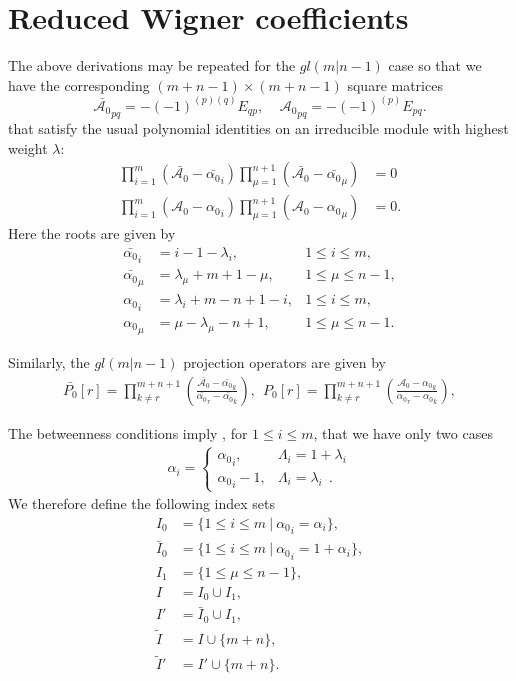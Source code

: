 \documentclass[12pt]{article}
\def\nn{\nonumber}
\begin{document}
\section{Reduced Wigner coefficients} 
\label{Wigner}
The above derivations may be repeated for the $gl(m|n-1)$ case so that we have the corresponding $(m+n-1) \times (m+n-1)$ square matrices
$$
\bar{\mathcal{A}_0}_{pq} = -(-1)^{(p)(q)} E_{qp}, ~~~~~{\mathcal{A}_0}_{pq} = -(-1)^{(p)} E_{pq}.
$$
that satisfy the usual polynomial identities on an irreducible module with highest weight $\lambda$:
\begin{align*}
\prod_{i=1}^m (\bar{\mathcal{A}_0} - \bar{\alpha_0}_i) \prod^{n+1}_{\mu = 1} (\bar{\mathcal{A}_0} - \bar{\alpha_0}_\mu) &= 0 \\
	\prod^m_{i=1} (\mathcal{A}_0 - {\alpha_0}_i ) \prod^{n+1}_{\mu=1} (\mathcal{A}_0 - {\alpha_0}_\mu) &= 0 .
\end{align*}
Here the roots are given by
\begin{align*}
\bar{\alpha_0}_i  &= i - 1 -{\lambda}_i , &1\leq i\leq m, \\
\bar{\alpha_0}_\mu &= {\lambda}_\mu + m + 1 - \mu,  &1\leq \mu \leq n - 1, \\
{\alpha_0}_i &= {\lambda}_i + m - n + 1 - i, &1\leq i\leq m, \\
{\alpha_0}_\mu &= \mu-{\lambda}_\mu - n + 1, &1\leq \mu \leq n - 1.  
\end{align*}

Similarly, the $gl(m|n-1)$ projection operators are given by
\begin{align}
\bar{P_0}[r] = \prod_{k\neq r}^{m+n+1}\left( \frac{\bar{\mathcal{A}_0}  -\bar{\alpha_0}_k}{\bar{\alpha_0}_r - \bar{\alpha_0}_k} \right),
\ \ 
P_0[r] = \prod_{k\neq r}^{m+n+1}\left( 
\frac{\mathcal{A}_0-{\alpha_0}_k}
{{\alpha_0}_r-{\alpha_0}_k} \right),
\end{align}

The betweenness conditions imply 
\cite{GIW1}, for $1\leq i\leq m$, that we have only two cases
\begin{align}
\alpha_i = \left\{ \begin{array}{rl} {\alpha_0}_i,& \Lambda_i = 1+\lambda_i\\
                                    {\alpha_0}_i - 1,& \Lambda_i = \lambda_i  ~~.
\end{array} \right.
\nn
\end{align}
We therefore define the following index sets
\begin{align}
I_0 &=  \{ 1\leq i\leq m\ |\ {\alpha_0}_i=\alpha_i\},\nn\\
\bar{I}_0 &=  \{ 1\leq i\leq m\ |\ {\alpha_0}_i=1+\alpha_i\},\nn\\
I_1 &= \{ 1\leq\mu\leq n-1\},\nn\\
I &= I_0\cup I_1,\nn\\
I'&= \bar{I}_0\cup I_1,\nn\\
\tilde{I} &= I\cup \{m+n\},\nn\\
\tilde{I}' &= I'\cup \{m+n\}.
\label{DefIndexSets} 
\end{align}
\end{document}

